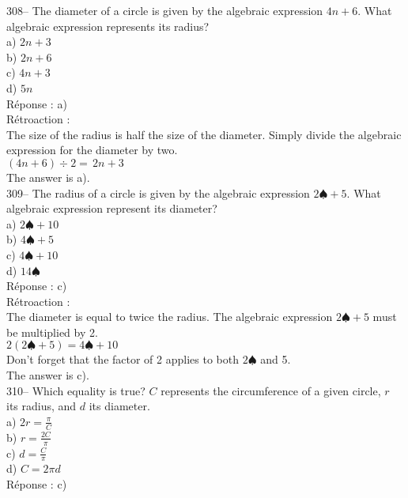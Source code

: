 \documentclass[letterpaper, 12pt]{article}
\begin{document}
308-- The diameter of a circle is given by the algebraic expression $4n+6$. What algebraic expression represents its radius?\\

a) $2n+3$\\
b) $2n+6$\\
c) $4n+3$\\
d) $5n$\\

R\'eponse : a)\\

R\'etroaction :\\
The size of the radius is half the size of the diameter. Simply divide the algebraic expression for the diameter by two.\\
$\left( 4n+6\right) \div2=\,2n+3$\\
The answer is a).\\


309-- The radius of a circle is given by the algebraic expression $2\spadesuit+5$. What algebraic expression represent its diameter? \\

a) $2\spadesuit+10$\\
b) $4\spadesuit+5$\\
c) $4\spadesuit+10$\\
d) $14\spadesuit$\\

R\'eponse : c)\\

R\'etroaction :\\
The diameter is equal to twice the radius. The algebraic expression $2\spadesuit+5$ must be multiplied by 2.\\
$2\left(2\spadesuit+5\right) =4\spadesuit+10$\\
Don't forget that the factor of 2 applies to both $2\spadesuit$ and 5.\\
The answer is c).\\

310-- Which equality is true? $C$ represents the circumference of a given circle, $r$ its radius, and $d$ its diameter.\\

a) $2r=\frac{\pi}{C}$\\[2mm]
b) $r=\frac{2C}{\pi}$\\[2mm]
c) $d=\frac{C}{\pi}$\\[2mm]
d) $C=2\pi d$\\

R\'eponse : c)\\
\end{document}
